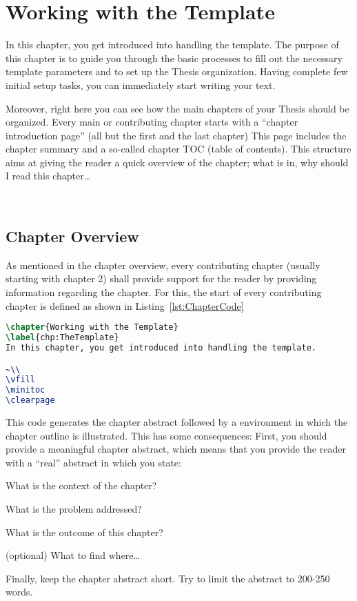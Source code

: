 
\chapter{Working with the Template}
\label{chp:TheTemplate}
In this chapter, you get introduced into handling the template. The purpose of this chapter is to guide you through the basic processes to fill out the necessary template parameters and to set up the Thesis organization. Having complete few initial setup tasks, you can immediately start writing your text.

Moreover, right here you can see how the main chapters of your Thesis should be organized. Every main or contributing chapter starts with a ``chapter introduction page'' (all but the first and the last chapter) This page includes the chapter summary and a so-called chapter TOC (table of contents). This structure aims at giving the reader a quick overview of the chapter; what is in, why should I read this chapter\ldots

~\\
\vfill
\minitoc
\clearpage


\section{Chapter Overview}
\label{sec:2:ChapterOverview}
As mentioned in the chapter overview, every contributing chapter (usually starting with chapter 2) shall provide support for the reader by providing information regarding the chapter. For this, the start of every contributing chapter is defined as shown in Listing~\ref{lst:ChapterCode}
\begin{lstlisting}[captionpos=b, language=TeX, commentstyle=\color{blue}\itshape, caption=Listing for generating the chapter overview,label=lst:ChapterCode]
\chapter{Working with the Template}
\label{chp:TheTemplate}
In this chapter, you get introduced into handling the template.

~\\
\vfill
\minitoc
\clearpage
\end{lstlisting}

This code generates the chapter abstract followed by a  environment in which the chapter outline is illustrated. This has some consequences: First, you should provide a meaningful chapter abstract, which means that you provide the reader with a ``real'' abstract in which you state:
\begin{compactitem}
	\item What is the context of the chapter?
	\item What is the problem addressed?
	\item What is the outcome of this chapter?
	\item (optional) What to find where\ldots
\end{compactitem}
Finally, keep the chapter abstract short. Try to limit the abstract to 200-250 words.



